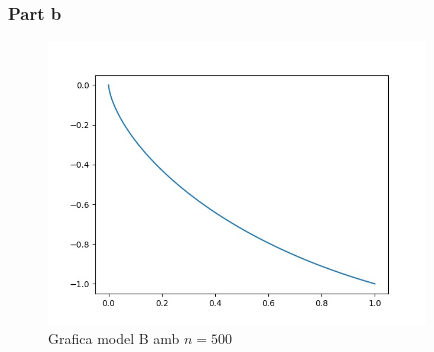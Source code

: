 \documentclass[12pt, a4papre]{article}
\begin{document}
	\subsubsection{Part b}
	
	\begin{figure}[H]
		\begin{center}
		\includegraphics[width=100mm]{modelB500.jpg}
		\end{center}
		\caption{Grafica model B amb $n = 500$}
		

\end{figure}
\end{document}
